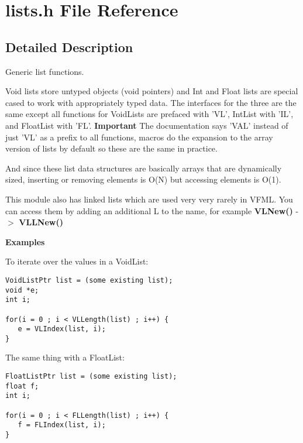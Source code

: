 \section{lists.h File Reference}
\label{lists_8h}


\subsection{Detailed Description}
Generic list functions. 

Void lists store untyped objects (void pointers) and Int and Float lists are special cased to work with appropriately typed data. The interfaces for the three are the same except all functions for Void\-Lists are prefaced with 'VL', Int\-List with 'IL', and Float\-List with 'FL'. {\bf Important} The documentation says 'VAL' instead of just 'VL' as a prefix to all functions, macros do the expansion to the array version of lists by default so these are the same in practice.

And since these list data structures are basically arrays that are dynamically sized, inserting or removing elements is O(N) but accessing elements is O(1).

This module also has linked lists which are used very very rarely in VFML. You can access them by adding an additional L to the name, for example {\bf VLNew()} -$>$ {\bf VLLNew()}





{\bf Examples} 

To iterate over the values in a Void\-List:



\footnotesize\begin{verbatim}VoidListPtr list = (some existing list); 
void *e;
int i;

for(i = 0 ; i < VLLength(list) ; i++) {
   e = VLIndex(list, i);
}
\end{verbatim}\normalsize


The same thing with a Float\-List:



\footnotesize\begin{verbatim}FloatListPtr list = (some existing list); 
float f;
int i;

for(i = 0 ; i < FLLength(list) ; i++) {
   f = FLIndex(list, i);
}
\end{verbatim}\normalsize


